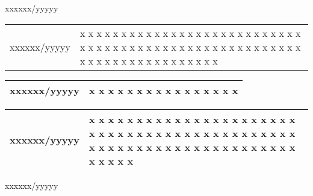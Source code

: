 


xxxxxx/yyyyy{%


\begin{tabular}{ | p{30mm} | p{129mm} | }
\hline
{\mktsStyleFontUrl{}xxxxxx/yyyyy} & x x x x x x x x x x x x x x x x x x x x x x x x x x x x x x x x x x x x x x x x x x x x x x x x x x x x x x x x x x x x x x x x x x x x x x x \\
\end{tabular}


\begin{tabular}{ | p{30mm} | p{129mm} | }
\hline
{\mktsStyleFontUrl{}xxxxxx/yyyyy} & x x x x x x x x x x x x x x x x \\
\hline
\end{tabular}


\begin{tabular}{ | p{30mm} | p{129mm} | }
{\mktsStyleFontUrl{}xxxxxx/yyyyy} & x x x x x x x x x x x x x x x x x x x x x x x x x x x x x x x x x x x x x x x x x x x x x x x x x x x x x x x x x x x x x x x x x x x x x x x \\
\hline
\end{tabular}
}


xxxxxx/yyyyy



